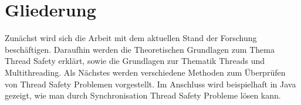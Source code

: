 \section{Gliederung}

Zunächst wird sich die Arbeit mit dem aktuellen Stand der Forschung beschäftigen. Daraufhin werden die Theoretischen Grundlagen zum Thema Thread Safety erklärt, sowie die Grundlagen zur Thematik Threads und Multithreading. Als Nächstes werden verschiedene Methoden zum Überprüfen von Thread Safety Problemen vorgestellt. Im Anschluss wird beispielhaft in Java gezeigt, wie man durch Synchronisation Thread Safety Probleme lösen kann.